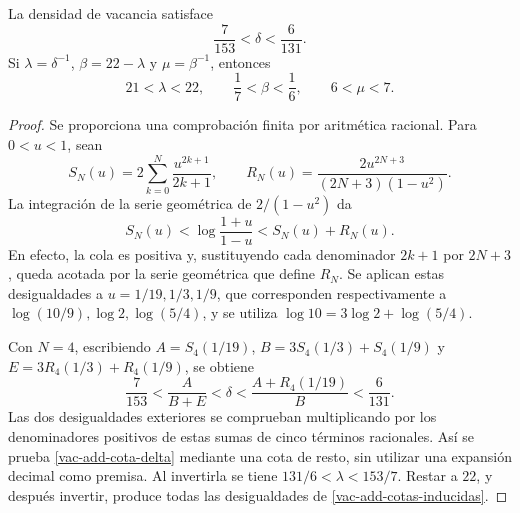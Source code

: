 \begin{lemma}
\label{vac-add-cotas}
La densidad de vacancia satisface
\begin{equation}
 \frac7{153}<\delta<\frac6{131}.
 \label{vac-add-cota-delta}
\end{equation}
Si \(\lambda=\delta^{-1}\), \(\beta=22-\lambda\) y
\(\mu=\beta^{-1}\), entonces
\begin{equation}
 21<\lambda<22,
 \qquad \frac17<\beta<\frac16,
 \qquad 6<\mu<7.
 \label{vac-add-cotas-inducidas}
\end{equation}
\end{lemma}
\begin{proof}
Se proporciona una comprobación finita por aritmética racional. Para
\(0<u<1\), sean
\[
 S_N(u)=2\sum_{k=0}^{N}\frac{u^{2k+1}}{2k+1},
 \qquad
 R_N(u)=\frac{2u^{2N+3}}{(2N+3)(1-u^2)}.
\]
La integración de la serie geométrica de \(2/(1-u^2)\) da
\[
 S_N(u)<\log\frac{1+u}{1-u}<S_N(u)+R_N(u).
\]
En efecto, la cola es positiva y, sustituyendo cada denominador
\(2k+1\) por \(2N+3\), queda acotada por la serie geométrica que
define \(R_N\). Se aplican estas desigualdades a
\(u=1/19,1/3,1/9\), que corresponden respectivamente a
\(\log(10/9),\log2,\log(5/4)\), y se utiliza
\(\log10=3\log2+\log(5/4)\).

Con \(N=4\), escribiendo \(A=S_4(1/19)\),
\(B=3S_4(1/3)+S_4(1/9)\) y
\(E=3R_4(1/3)+R_4(1/9)\), se obtiene
\[
 \frac7{153}
 <\frac{A}{B+E}
 <\delta
 <\frac{A+R_4(1/19)}{B}
 <\frac6{131}.
\]
Las dos desigualdades exteriores se comprueban multiplicando por los
denominadores positivos de estas sumas de cinco términos racionales.
Así se prueba \eqref{vac-add-cota-delta} mediante una cota de resto,
sin utilizar una expansión decimal como premisa. Al invertirla se tiene
\(131/6<\lambda<153/7\). Restar a \(22\), y después invertir,
produce todas las desigualdades de \eqref{vac-add-cotas-inducidas}.
\end{proof}

